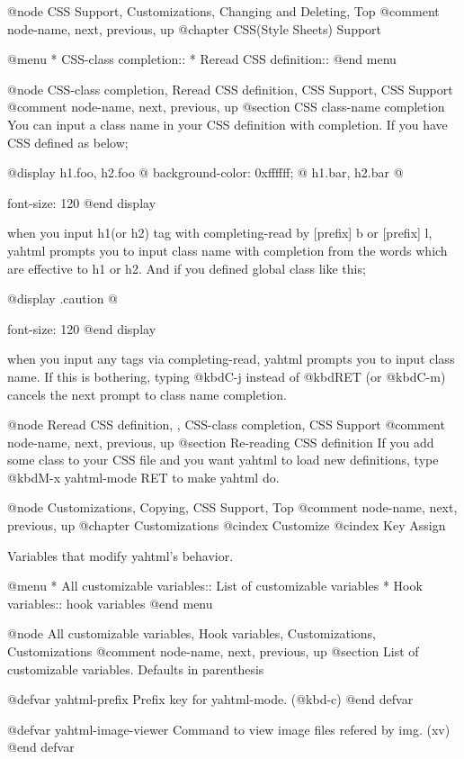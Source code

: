 @node CSS Support, Customizations, Changing and Deleting, Top
@comment  node-name,  next,  previous,  up
@chapter CSS(Style Sheets) Support

@menu
* CSS-class completion::        
* Reread CSS definition::       
@end menu

@node CSS-class completion, Reread CSS definition, CSS Support, CSS Support
@comment  node-name,  next,  previous,  up
@section CSS class-name completion
You can input a class name in your CSS definition with completion.
If you have CSS defined as below;

@display
 h1.foo, h2.foo @{ background-color: 0xffffff; @}
 h1.bar, h2.bar @{ font-size: 120%
@end display

when you input h1(or h2) tag with completing-read by [prefix] b or
[prefix] l, yahtml prompts you to input class name with completion from
the words which are effective to h1 or h2.  And if you defined 
global class like this;

@display
 .caution @{ font-size: 120%
@end display

when you input any tags via completing-read, yahtml prompts you to input
class name.  If this is bothering, typing @kbd{C-j} instead of
@kbd{RET} (or @kbd{C-m}) cancels the next prompt to class name completion.

@node Reread CSS definition,  , CSS-class completion, CSS Support
@comment  node-name,  next,  previous,  up
@section Re-reading CSS definition
If you add some class to your CSS file and you want yahtml to load
new definitions, type @kbd{M-x yahtml-mode RET} to make yahtml do.

@node Customizations, Copying, CSS Support, Top
@comment  node-name,  next,  previous,  up
@chapter Customizations
@cindex Customize
@cindex Key Assign

Variables that modify yahtml's behavior.

@menu
* All customizable variables::  List of customizable variables
* Hook variables::              hook variables
@end menu

@node All customizable variables, Hook variables, Customizations, Customizations
@comment  node-name,  next,  previous,  up
@section List of customizable variables.  Defaults in parenthesis

@defvar yahtml-prefix
Prefix key for yahtml-mode.  (@kbd{\C-c})
@end defvar

@defvar yahtml-image-viewer
Command to view image files refered by img. (xv)
@end defvar

}}
